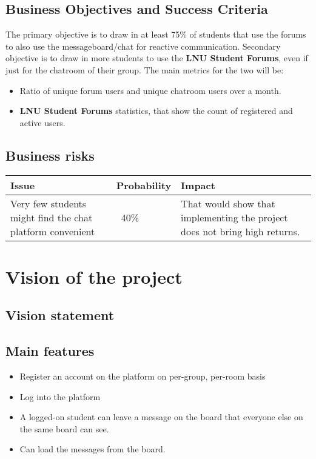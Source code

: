 \documentclass[12pt]{article}
\begin{document}
	\subsection{Business Objectives and Success Criteria}
	The primary objective is to draw in at least 75\% of students that use the forums to also use the messageboard/chat for reactive communication. Secondary objective is to draw in more students to use the \textbf{LNU Student Forums}, even if just for the chatroom of their group. The main metrics for the two will be: 
	\begin{itemize}
		\item Ratio of unique forum users and unique chatroom users over a month. 
		\item \textbf{LNU Student Forums} statistics, that show the count of registered and active users. 
	\end{itemize}
	\subsection{Business risks}
	\begin{tabularx}{1.075\textwidth}{|p{}|p{}|p{}|}
		\firsthline
		Issue & Probability & Impact \\ \hline
		Very few students might find the chat platform convenient & ~40\% & That would show that implementing the project does not bring high returns. \\ \hline
	\end{tabularx}
	\section{Vision of the project}
	\subsection{Vision statement}
	\subsection{Main features}
	\begin{itemize}
		\item Register an account on the platform on per-group, per-room basis
		\item Log into the platform
		\item A logged-on student can leave a message on the board that everyone else on the same board can see.
		\item Can load the messages from the board.
	\end{itemize}
\end{document}

